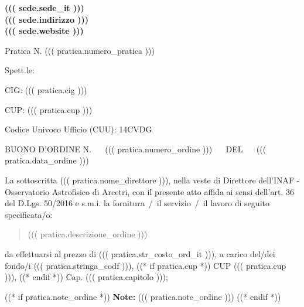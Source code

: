 \documentclass[a4paper,12pt]{letter}
\begin{document}
\vspace{-2.5cm}
\begin{center}
\small \bf
((( sede.sede_it ))) \\
((( sede.indirizzo )))  \\
((( sede.website )))
\end{center}
\thispagestyle{empty}
\vspace{1cm}
{\small Pratica N. ((( pratica.numero_pratica ))) }
\vspace{.4cm}

\begin{flushright}
\begin{minipage}{10cm}
Spett.le:\\
\end{minipage}
\end{flushright}
\vspace{5mm}

CIG: ((( pratica.cig ))) 

CUP: ((( pratica.cup )))

Codice Univoco Ufficio (CUU): 14CVDG

BUONO D'ORDINE N. ~~ ((( pratica.numero_ordine ))) ~~ DEL ~~ ((( pratica.data_ordine )))

La sottoscritta ((( pratica.nome_direttore ))), 
nella veste di Direttore dell'INAF - Osservatorio Astrofisico di Arcetri,
con il presente atto affida ai sensi dell'art. 36 del D.Lgs. 50/2016 e s.m.i.
la fornitura~/~il servizio~/~il lavoro di seguito specificata/o:

\begin{quote}
((( pratica.descrizione_ordine )))
\end{quote}

da effettuarsi al prezzo di ((( pratica.str_costo_ord_it ))),
a carico del/dei fondo/i ((( pratica.stringa_codf ))), ((* if pratica.cup *)) CUP ((( pratica.cup ))), ((* endif *)) Cap. ((( pratica.capitolo ))); 

((* if pratica.note_ordine *))
{\bf Note:} ((( pratica.note_ordine )))
((* endif *))
\vspace{1cm}
\end{document}
